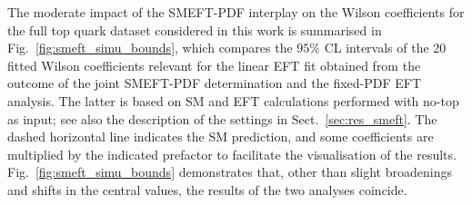 \documentclass[withindex,glossary]{cam-thesis}
\begin{document}
The moderate impact of the SMEFT-PDF interplay on the Wilson coefficients 
for the full top quark dataset considered in this work is summarised in Fig.~\ref{fig:smeft_simu_bounds},
which 
compares the $95 \%$ CL intervals of the 20 fitted Wilson coefficients
relevant for the linear EFT fit obtained from the outcome of the joint SMEFT-PDF determination
and the fixed-PDF EFT analysis.
%
The latter is based on SM and EFT calculations performed with
no-top as input; see also the description of the settings in
Sect.~\ref{sec:res_smeft}.
%
The dashed horizontal line indicates the SM prediction,
and  some coefficients are multiplied by the indicated prefactor
to facilitate the visualisation of the results. 
%
Fig.~\ref{fig:smeft_simu_bounds} demonstrates that, other than slight
broadenings and shifts in the central values,
the results of the two analyses coincide.
\end{document}
